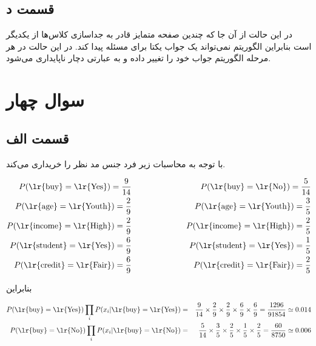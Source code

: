 \documentclass{article}
\begin{document}
\subsection*{قسمت د}

در این حالت از آن جا که چندین صفحه متمایز قادر به جداسازی کلاس‌ها از یکدیگر است بنابراین
الگوریتم  نمی‌تواند یک جواب یکتا برای مسئله پیدا کند. در این حالت
در هر مرحله الگوریتم جواب خود را تغییر داده و به عبارتی دچار ناپایداری می‌شود.

\section*{سوال چهار}

\subsection*{قسمت الف}

با توجه به محاسبات زیر فرد  جنس مد نظر را خریداری می‌کند.

\begin{eqnarray*}
    P(\text{\lr{buy}}=\text{\lr{Yes}}) = \frac{9}{14} & \hspace{2cm} & P(\text{\lr{buy}}=\text{\lr{No}}) = \frac{5}{14}\\
    P(\text{\lr{age}}=\text{\lr{Youth}}) = \frac{2}{9} & \hspace{2cm} & P(\text{\lr{age}}=\text{\lr{Youth}}) = \frac{3}{5}\\
    P(\text{\lr{income}}=\text{\lr{High}}) = \frac{2}{9} & \hspace{2cm} & P(\text{\lr{income}}=\text{\lr{High}}) = \frac{2}{5}\\
    P(\text{\lr{student}}=\text{\lr{Yes}}) = \frac{6}{9} & \hspace{2cm} & P(\text{\lr{student}}=\text{\lr{Yes}}) = \frac{1}{5}\\
    P(\text{\lr{credit}}=\text{\lr{Fair}}) = \frac{6}{9} & \hspace{2cm} & P(\text{\lr{credit}}=\text{\lr{Fair}}) = \frac{2}{5}\\
\end{eqnarray*}

بنابراین

\begin{eqnarray*}
    P(\text{\lr{buy}}=\text{\lr{Yes}})\prod_{i} P(x_i|\text{\lr{buy}}=\text{\lr{Yes}}) & = &  \frac{9}{14} \times \frac{2}{9} \times \frac{2}{9} \times \frac{6}{9} \times \frac{6}{9} =  \frac{1296}{91854} \simeq 0.014\\
    P(\text{\lr{buy}}=\text{\lr{No}})\prod_{i} P(x_i|\text{\lr{buy}}=\text{\lr{No}})  & = & \frac{5}{14} \times \frac{3}{5} \times \frac{2}{5} \times \frac{1}{5} \times \frac{2}{5} = \frac{60}{8750} \simeq 0.006
\end{eqnarray*}
\end{document}
